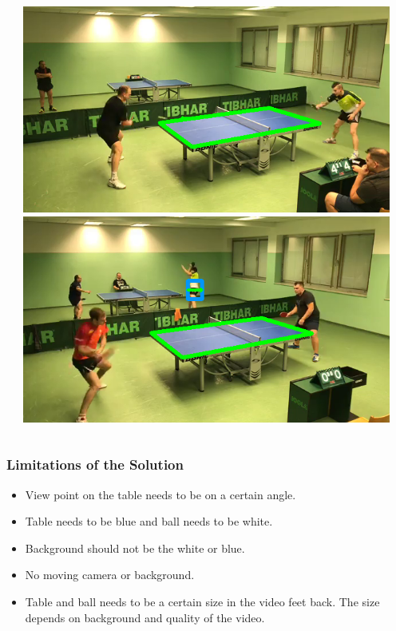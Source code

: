 \documentclass{beamer}
\begin{document}
\begin{frame}
\begin{columns}[onlytextwidth]
\begin{column}{0.5\textwidth}
		\end{column}
		\begin{column}{0.5\textwidth}
			\begin{center}
			\includegraphics[width=0.95\textwidth]{wrong3}\\
			\includegraphics[width=0.95\textwidth]{wrong4}\\
			\end{center}
		\end{column}
	\end{columns}\end{frame}

\begin{frame}
	\frametitle{Limitations of the Solution}
	\begin{itemize}
		\item View point on the table needs to be on a certain angle.
		\item Table needs to be blue and ball needs to be white. 
		\item Background should not be the white or blue.
		\item No moving camera or background.
		\item Table and ball needs to be a certain size in the video feet back. The size depends on background and quality of the video.
	\end{itemize}
\end{frame}
\end{document}
